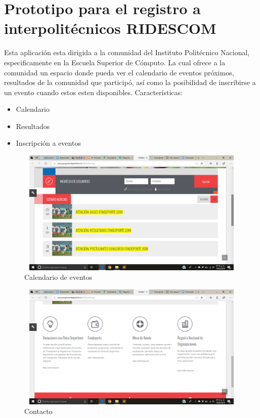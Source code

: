 \section{Prototipo para el registro a interpolitécnicos RIDESCOM}
\noindent Esta aplicación esta dirigida a la comunidad del Instituto Politécnico Nacional, especificamente en la Escuela Superior de Cómputo. La cual ofrece a la comunidad un espacio donde pueda ver el calendario de eventos próximos, resultados de la comunidad que participó, así como la posibilidad de inscribirse a un evento cuando estos esten disponibles.
Características: 
\begin{itemize}
	\item Calendario
	\item Resultados
	\item Inscripción a eventos
\end{itemize}
\begin{figure}[hbt!]
	\centering
	\includegraphics[width=12cm, height=6cm]{Imagenes/Aplicaciones/INDC1.png}
	\caption{Calendario de eventos}
\end{figure}
\begin{figure}[hbt!]
	\centering
	\includegraphics[width=12cm, height=6cm]{Imagenes/Aplicaciones/INDC2.png}
	\caption{Contacto}
\end{figure}